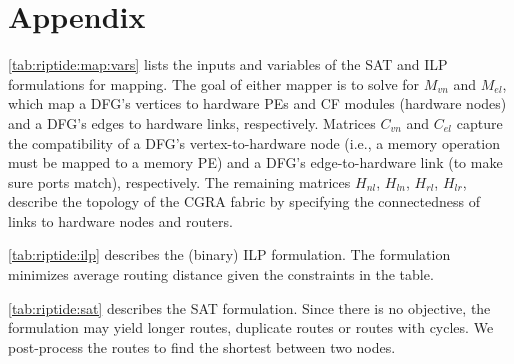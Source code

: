 \onecolumn
\appendix
\section{Appendix}
\label{riptide:appendix}

\tabRipTideMapVars
\autoref{tab:riptide:map:vars} lists the inputs and variables of the SAT and ILP formulations for mapping.
% 
The goal of either mapper is to solve for $M_{vn}$ and $M_{el}$, which map a DFG's vertices to hardware PEs and CF modules (hardware nodes) and a DFG's edges to hardware links, respectively.
% 
Matrices $C_{vn}$ and $C_{el}$ capture the compatibility of a DFG's vertex-to-hardware node (i.e., a memory operation must be mapped to a memory PE) and a DFG's edge-to-hardware link (to make sure ports match), respectively.
% 
The remaining matrices $H_{nl}$, $H_{ln}$, $H_{rl}$, $H_{lr}$, describe the topology of the CGRA fabric by specifying the connectedness of links to hardware nodes and routers.

\tabRipTideILP
\autoref{tab:riptide:ilp} describes the (binary) ILP formulation.
% 
The formulation minimizes average routing distance given the constraints in the table.

\tabRipTideSAT
\autoref{tab:riptide:sat} describes the SAT formulation.
% 
Since there is no objective, the formulation may yield longer routes, duplicate routes or routes with cycles.
% 
We post-process the routes to find the shortest between two nodes.
